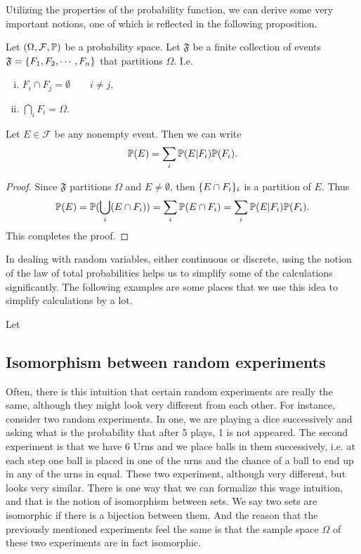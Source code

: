 Utilizing the properties of the probability function, we can derive some very important notions, one of which is reflected in the following proposition.

\begin{proposition}
	Let $(\Omega, \mathcal{F}, \mathbb{P})$ be a probability space. Let $\mathfrak{F}$ be a finite collection of events $\mathfrak{F} = \{F_1,F_2,\cdots, F_n\}$ that partitions $\Omega$. I.e.
	\begin{enumerate}[(i)]
		\item $F_i \cap F_j = \emptyset \qquad i\neq j$,
		\item $\bigcap_{i} F_i = \Omega$.
	\end{enumerate}
	Let $E \in \mathcal{F}$ be any nonempty event. Then we can write
	\[  \mathbb{P}(E) = \sum_{i} \mathbb{P}(E|F_i)\mathbb{P}(F_i). \]
\end{proposition}
\begin{proof}
	Since $\mathfrak{F}$ partitions $\Omega$ and $E \neq \emptyset$, then $\{E\cap F_i\}_i$ is a partition of $E$. Thus
	\[ \mathbb{P}(E) = \mathbb{P}(\bigcup_i (E \cap F_i)) = \sum_i \mathbb{P}(E \cap F_i) = \sum_i \mathbb{P}(E|F_i)\mathbb{P}(F_i). \]
	This completes the proof.
\end{proof}


In dealing with random variables, either continuous or discrete, using the notion of the law of total probabilities helps us to simplify some of the calculations significantly. The following examples are some places that we use this idea to simplify calculations by a lot. 

\begin{example}
	Let 
\end{example}




\subsection{Isomorphism between random experiments}
Often, there is this intuition that certain random experiments are really the same, although they might look very different from each other. For instance, consider two random experiments. In one, we are playing a dice successively and asking what is the probability that after 5 plays, 1 is not appeared. The second experiment is that we have 6 Urns and we place balls in them successively, i.e. at each step one ball is placed in one of the urns and the chance of a ball to end up in any of the urns in equal. These two experiment, although very different, but looks very similar. There is one way that we can formalize this wage intuition, and that is the notion of isomorphism between sets. We say two sets are isomorphic if there is a bijection between them. And the reason that the previously mentioned experiments feel the same is that the sample space $\Omega$ of these two experiments are in fact isomorphic. 

